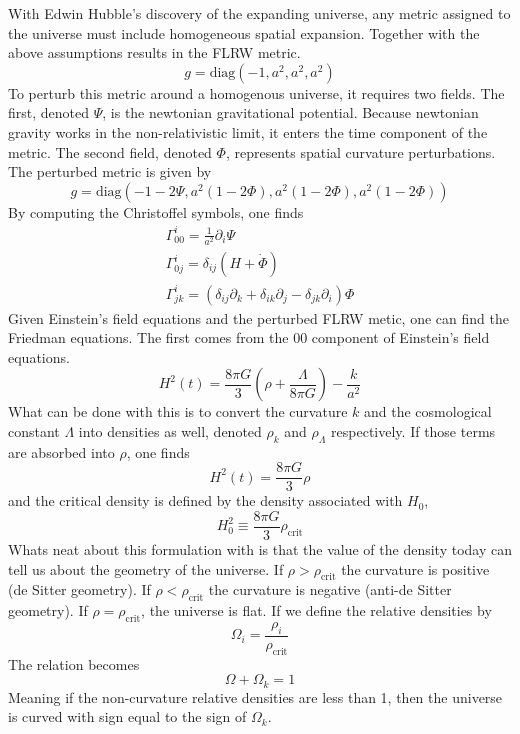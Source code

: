 With Edwin Hubble's discovery of the expanding universe, any metric assigned to the universe must include homogeneous spatial expansion. Together with the above assumptions results in the FLRW metric.
\begin{equation}
    g = \text{diag}(-1,a^2,a^2,a^2)
\end{equation}
To perturb this metric around a homogenous universe, it requires two fields. The first, denoted $\Psi$, is the newtonian gravitational potential. Because newtonian gravity works in the non-relativistic limit, it enters the time component of the metric. The second field, denoted $\Phi$, represents spatial curvature perturbations. The perturbed metric is given by
\begin{equation}
    g = \text{diag}(-1-2\Psi,a^2(1-2\Phi),a^2(1-2\Phi),a^2(1-2\Phi))
\end{equation}
By computing the Christoffel symbols, one finds
\begin{equation}
    \begin{split}
        \Gamma^i_{00} = \frac{1}{a^2}\partial_i\Psi \\
        \Gamma^i_{0j} = \delta_{ij}(H+\dot\Phi) \\
        \Gamma^i_{jk} = (\delta_{ij} \partial_k + \delta_{ik}\partial_j - \delta_{jk}\partial_i)\Phi
    \end{split}
\end{equation}
Given Einstein's field equations and the perturbed FLRW metic, one can find the Friedman equations. The first comes from the 00 component of Einstein's field equations.
\begin{equation}
    H^2(t) = \frac{8\pi G}{3}\left(\rho + \frac{\Lambda}{8\pi G}\right) - \frac{k}{a^2}
\end{equation}
What can be done with this is to convert the curvature $k$ and the cosmological constant $\Lambda$ into densities as well, denoted $\rho_k$ and $\rho_\Lambda$ respectively. If those terms are absorbed into $\rho$, one finds
\begin{equation}
    H^2(t) = \frac{8\pi G}{3}\rho
\end{equation}
and the critical density is defined by the density associated with $H_0$,
\begin{equation}
    H_0^2 \equiv \frac{8\pi G}{3}\rho_{\text{crit}}
\end{equation}
Whats neat about this formulation with is that the value of the density today can tell us about the geometry of the universe. If $\rho>\rho_{\text{crit}}$ the curvature is positive (de Sitter geometry). If $\rho<\rho_{\text{crit}}$ the curvature is negative (anti-de Sitter geometry). If $\rho=\rho_{\text{crit}}$, the universe is flat. If we define the relative densities by
\begin{equation}
    \Omega_i = \frac{\rho_i}{\rho_\text{crit}}
\end{equation}
The relation becomes
\begin{equation}
    \Omega + \Omega_k = 1 
\end{equation}
Meaning if the non-curvature relative densities are less than 1, then the universe is curved with sign equal to the sign of $\Omega_k$.

